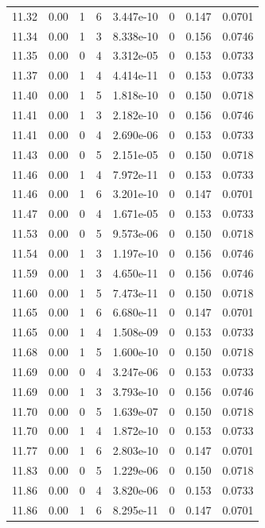 \documentclass[preview]{standalone}
\begin{document}
{{{{{{{{{{{\begin{tabular}{L{1.2cm}C{1.2cm} C{0.3cm}C{0.5cm} C{1.4cm}C{1.4cm} C{1.4cm}C{1.4cm}}
  11.32  &  0.00  & 1     &  6 &  3.447e-10  & 0  & 0.147 &  0.0701   \\ 
  11.34  &  0.00  & 1     &  3 &  8.338e-10  & 0  & 0.156 &  0.0746   \\ 
  11.35  &  0.00  & 0     &  4 &  3.312e-05  & 0  & 0.153 &  0.0733   \\ 
  11.37  &  0.00  & 1     &  4 &  4.414e-11  & 0  & 0.153 &  0.0733   \\ 
  11.40  &  0.00  & 1     &  5 &  1.818e-10  & 0  & 0.150 &  0.0718   \\ 
  11.41  &  0.00  & 1     &  3 &  2.182e-10  & 0  & 0.156 &  0.0746   \\ 
  11.41  &  0.00  & 0     &  4 &  2.690e-06  & 0  & 0.153 &  0.0733   \\ 
  11.43  &  0.00  & 0     &  5 &  2.151e-05  & 0  & 0.150 &  0.0718   \\ 
  11.46  &  0.00  & 1     &  4 &  7.972e-11  & 0  & 0.153 &  0.0733   \\ 
  11.46  &  0.00  & 1     &  6 &  3.201e-10  & 0  & 0.147 &  0.0701   \\ 
  11.47  &  0.00  & 0     &  4 &  1.671e-05  & 0  & 0.153 &  0.0733   \\ 
  11.53  &  0.00  & 0     &  5 &  9.573e-06  & 0  & 0.150 &  0.0718   \\ 
  11.54  &  0.00  & 1     &  3 &  1.197e-10  & 0  & 0.156 &  0.0746   \\ 
  11.59  &  0.00  & 1     &  3 &  4.650e-11  & 0  & 0.156 &  0.0746   \\ 
  11.60  &  0.00  & 1     &  5 &  7.473e-11  & 0  & 0.150 &  0.0718   \\ 
  11.65  &  0.00  & 1     &  6 &  6.680e-11  & 0  & 0.147 &  0.0701   \\ 
  11.65  &  0.00  & 1     &  4 &  1.508e-09  & 0  & 0.153 &  0.0733   \\ 
  11.68  &  0.00  & 1     &  5 &  1.600e-10  & 0  & 0.150 &  0.0718   \\ 
  11.69  &  0.00  & 0     &  4 &  3.247e-06  & 0  & 0.153 &  0.0733   \\ 
  11.69  &  0.00  & 1     &  3 &  3.793e-10  & 0  & 0.156 &  0.0746   \\ 
  11.70  &  0.00  & 0     &  5 &  1.639e-07  & 0  & 0.150 &  0.0718   \\ 
  11.70  &  0.00  & 1     &  4 &  1.872e-10  & 0  & 0.153 &  0.0733   \\ 
  11.77  &  0.00  & 1     &  6 &  2.803e-10  & 0  & 0.147 &  0.0701   \\ 
  11.83  &  0.00  & 0     &  5 &  1.229e-06  & 0  & 0.150 &  0.0718   \\ 
  11.86  &  0.00  & 0     &  4 &  3.820e-06  & 0  & 0.153 &  0.0733   \\ 
  11.86  &  0.00  & 1     &  6 &  8.295e-11  & 0  & 0.147 &  0.0701   \\ 
\hline 
\end{tabular} 

}}}}}}}}}}}
\end{document}
